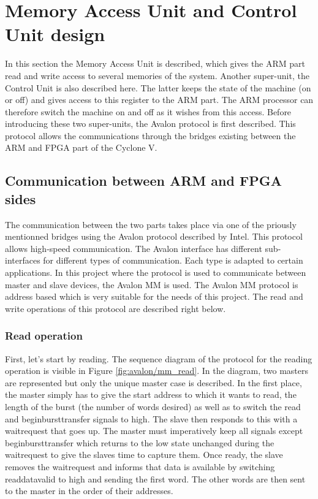 \chapter{Memory Access Unit and Control Unit design}

In this section the Memory Access Unit is described, which gives the ARM part read and write 
access to several memories of the system. Another super-unit, the Control Unit is also described here. 
The latter keeps the state of the machine (on or off) and gives access to this register to the 
ARM part. The ARM processor can therefore switch the machine on and off as it wishes from this 
access. Before introducing these two super-units, the Avalon protocol is first described. This 
protocol allows the communications through the bridges existing between the ARM and FPGA part of
the Cyclone V.

\section{Communication between ARM and FPGA sides}

The communication between the two parts takes place via one of the priously mentionned bridges using 
the Avalon protocol described by Intel. This protocol allows 
high-speed communication. The Avalon interface has different sub-interfaces for different types 
of communication. Each type is adapted to certain applications. In this project where the protocol 
is used to communicate between master and slave devices, the Avalon MM is used. 
The Avalon MM protocol is address based which is very suitable for the needs of this project.
The read and write operations of this protocol are described right below.

\subsection{Read operation}

First, let's start by reading. The sequence diagram of the protocol for the reading operation is 
visible in Figure \ref{fig:avalon/mm_read}. In the diagram, two masters are represented but only 
the unique master case is described. In the first place, the master simply has to give
the start address to which it wants to read, the length of the burst (the number of words desired) 
as well as to switch the read and beginbursttransfer signals to high. The slave then responds 
to this with a waitrequest that goes up. The master must imperatively keep all signals except 
beginbursttransfer which returns to the low state unchanged during the waitrequest to give the 
slaves time to capture them. Once ready, the slave removes the waitrequest and informs that  
data is available by switching readdatavalid to high and sending the first word. The other words 
are then sent to the master in the order of their addresses. 

